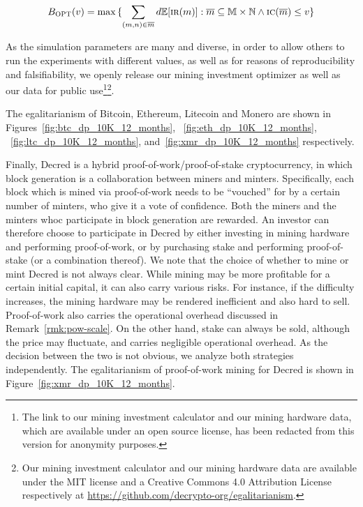 \[
  B_\textsc{OPT}(v)
  =
  \max{
    \{
      \sum_{(m, n) \in \overline{m}}
      {d\mathbb{E}[\textsc{ir}(m)]}:
      \overline{m} \subseteq \mathbb{M} \times \mathbb{N}
      \land
      \textsc{ic}(\overline{m}) \leq v
    \}
  }
\]

As the simulation parameters are many and diverse, in order to allow others to
run the experiments with different values, as well as for reasons of
reproducibility and falsifiability, we openly release our mining investment
optimizer as well as our data for public use\ifanonymous\footnote{
  The link to our mining investment calculator and our mining hardware data,
  which are available under an open source license, has been redacted from this
  version for anonymity purposes.
}\else\footnote{
  Our mining investment calculator and our mining hardware data are available
  under the MIT license and a Creative Commons 4.0 Attribution License
  respectively at \url{https://github.com/decrypto-org/egalitarianism}.
}\fi.

The egalitarianism of Bitcoin, Ethereum, Litecoin and Monero are shown in
Figures~\ref{fig:btc_dp_10K_12_months}, ~\ref{fig:eth_dp_10K_12_months},
~\ref{fig:ltc_dp_10K_12_months}, and~\ref{fig:xmr_dp_10K_12_months}
respectively.

Finally, Decred is a hybrid proof-of-work/proof-of-stake cryptocurrency, in
which block generation is a collaboration between miners and minters.
Specifically, each block which is mined via proof-of-work needs to be
``vouched'' for by a certain number of minters, who give it a vote of
confidence. Both the miners and the minters whoc participate in block
generation are rewarded. An investor can therefore choose to participate in
Decred by either investing in mining hardware and performing proof-of-work, or
by purchasing stake and performing proof-of-stake (or a combination thereof).
We note that the choice of whether to mine or mint Decred is not always clear.
While mining may be more profitable for a certain initial capital, it can also
carry various risks. For instance, if the difficulty increases, the mining
hardware may be rendered inefficient and also hard to sell. Proof-of-work also
carries the operational overhead discussed in Remark~\ref{rmk:pow-scale}. On
the other hand, stake can always be sold, although the price may fluctuate, and
carries negligible operational overhead. As the decision between the two is not
obvious, we analyze both strategies independently. The egalitarianism of
proof-of-work mining for Decred is shown in
Figure~\ref{fig:xmr_dp_10K_12_months}.

